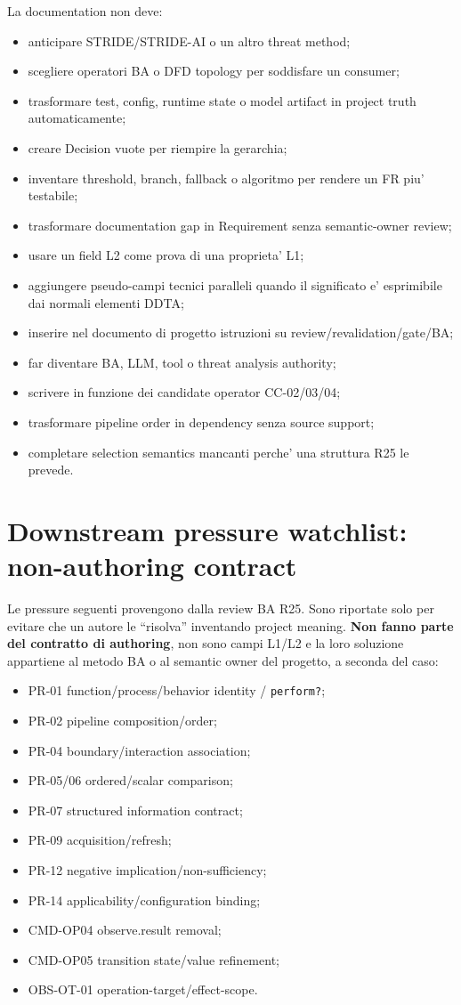 \documentclass[11pt,a4paper]{article}
\begin{document}
La documentation non deve:
\begin{itemize}
\item anticipare STRIDE/STRIDE-AI o un altro threat method;
\item scegliere operatori BA o DFD topology per soddisfare un consumer;
\item trasformare test, config, runtime state o model artifact in project truth automaticamente;
\item creare Decision vuote per riempire la gerarchia;
\item inventare threshold, branch, fallback o algoritmo per rendere un FR piu' testabile;
\item trasformare documentation gap in Requirement senza semantic-owner review;
\item usare un field L2 come prova di una proprieta' L1;
\item aggiungere pseudo-campi tecnici paralleli quando il significato e' esprimibile dai normali elementi DDTA;
\item inserire nel documento di progetto istruzioni su review/revalidation/gate/BA;
\item far diventare BA, LLM, tool o threat analysis authority;
\item scrivere in funzione dei candidate operator CC-02/03/04;
\item trasformare pipeline order in dependency senza source support;
\item completare selection semantics mancanti perche' una struttura R25 le prevede.
\end{itemize}

\section{Downstream pressure watchlist: non-authoring contract}
\opentag

Le pressure seguenti provengono dalla review BA R25. Sono riportate solo per evitare che un autore le ``risolva'' inventando project meaning. \textbf{Non fanno parte del contratto di authoring}, non sono campi L1/L2 e la loro soluzione appartiene al metodo BA o al semantic owner del progetto, a seconda del caso:
\begin{itemize}
\item PR-01 function/process/behavior identity / \texttt{perform?};
\item PR-02 pipeline composition/order;
\item PR-04 boundary/interaction association;
\item PR-05/06 ordered/scalar comparison;
\item PR-07 structured information contract;
\item PR-09 acquisition/refresh;
\item PR-12 negative implication/non-sufficiency;
\item PR-14 applicability/configuration binding;
\item CMD-OP04 observe.result removal;
\item CMD-OP05 transition state/value refinement;
\item OBS-OT-01 operation-target/effect-scope.
\end{itemize}
\end{document}
